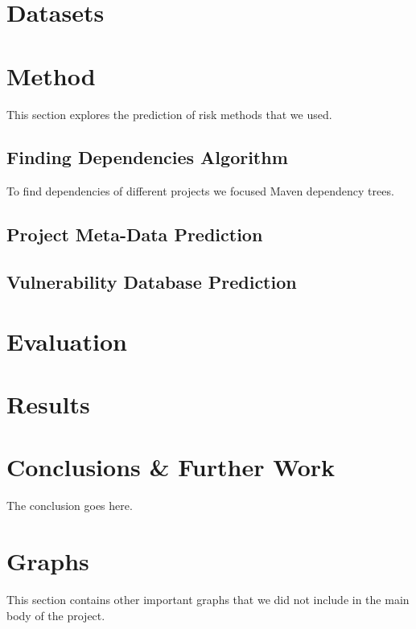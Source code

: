 \documentclass[10pt, onecolumn]{IEEEtran}
\begin{document}
\section{Datasets}

\section{Method}
This section explores the prediction of risk methods that we used.

\subsection{Finding Dependencies Algorithm}
To find dependencies of different projects we focused Maven dependency trees. 

\subsection{Project Meta-Data Prediction}

\subsection{Vulnerability Database Prediction}

\section{Evaluation}

\section{Results}


\section{Conclusions \& Further Work}
The conclusion goes here.


\appendices
\section{Graphs}
This section contains other important graphs that we did not include in the main body of the project.


\ifCLASSOPTIONcaptionsoff
  \newpage
\fi
\end{document}
